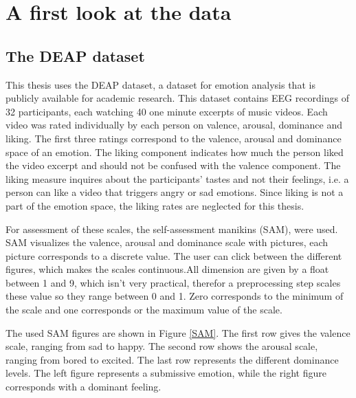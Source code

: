 \chapter{A first look at the data}
{\samenvatting }

\section{The DEAP dataset}
This thesis uses the DEAP dataset\cite{DEAP}, a dataset for emotion analysis that is publicly available for academic research. This dataset contains EEG recordings of 32 participants, each watching 40 one minute excerpts of music videos. Each video was rated individually by each person on valence, arousal, dominance and liking. The first three ratings correspond to the valence, arousal and dominance space of an emotion. The liking component indicates how much the person liked the video excerpt and should not be confused with the valence component. The liking measure inquires about the participants' tastes and not their feelings, i.e. a person can like a video that triggers angry or sad emotions. Since liking is not a part of the emotion space, the liking rates are neglected for this thesis.

\npar

For assessment of these scales, the self-assessment manikins (SAM), were used\cite{DEAP}. SAM visualizes the valence, arousal and dominance scale with pictures, each picture corresponds to a discrete value. The user can click between the different figures, which makes the scales continuous.All dimension are given by a float between 1 and 9, which isn't very practical, therefor a preprocessing step scales these value so they range between 0 and 1. Zero corresponds to the minimum of the scale and one corresponds or the maximum value of the scale.

 The used SAM figures are shown in Figure \ref{SAM}. The first row gives the valence scale, ranging from sad to happy. The second row shows the arousal scale, ranging from bored to excited. The last row represents the different dominance levels. The left figure represents a submissive emotion, while the right figure corresponds with a dominant feeling.









